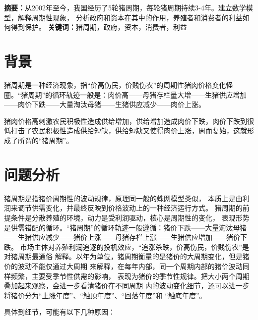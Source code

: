 \documentclass[a4paper,AutoFakeBold,AutoFakeSlant]{ctexart}
\title{\heiti{数学建模HW2实验报告}}
\author{PB19151769~~~~~~马宇骁}
\makeatletter
\renewcommand{\abstractname}{}    %
\renewenvironment{abstract}{%
      \if@twocolumn
        \section*{\abstractname}%
      \else
        \small
        \begin{center}%
          {\bfseries \abstractname\vspace{-.5em}\vspace{\z@}}%
        \end{center}%
      \fi}
      {}
\makeatother
\begin{document}
\maketitle

\begin{abstract} \kaishu
\noindent 
\textbf{\heiti 摘要：}从2002年至今，我国经历了5轮猪周期，每轮猪周期持续3-4年。建立数学模型，解释周期性现象，
分析政府和资本在其中的作用，养殖者和消费者的利益如何得到保护。
   \newline
\textbf{\heiti 关键词：}猪周期，政府，资本，消费者，利益
\end{abstract}



\section{背景}


猪周期是一种经济现象，指“价高伤民，价贱伤农”的周期性猪肉价格变化怪圈。“猪周期”的循环轨迹一般是：肉价高——母猪存栏量大增——生猪供应增加——肉价下跌——大量淘汰母猪——生猪供应减少——肉价上涨。

猪肉价格高刺激农民积极性造成供给增加，供给增加造成肉价下跌，肉价下跌到很低打击了农民积极性造成供给短缺，供给短缺又使得肉价上涨，周而复始，这就形成了所谓的“猪周期”。

\section{问题分析}

猪周期是指猪价周期性的波动规律，原理同一般的蛛网模型类似，
本质上是由利润来调节供需变化，并最终反映到价格波动上的一种经济运行方式。
猪周期的前提条件是分散养殖的环境，动力是受利润驱动，核心是周期性的变化，
表现形势是供需错配的循环。“猪周期”的循环轨迹一般遵循：猪价下跌——大量淘汰母猪
——生猪供应减少——猪价上涨——母猪存栏上涨——生猪供应增加——猪价下跌。
市场主体对养殖利润追逐的投机效应，“追涨杀跌，价高伤民，价贱伤农”是对猪周期最通俗
解释。以年为单位，猪周期衡量的是猪价的大周期变化，但是猪价的波动不能仅通过大周期
来解释，在每年内部，同一个周期内部的猪价波动同样频繁，主要受季节性供需的影响，
表现为猪价的季节性规律。把大小两个周期叠加起来观察，会进一步看清猪价在不同周期
内的波动变化细节，还可以进一步将猪价分为“上涨年度”、“触顶年度”、“回落年度”和
“触底年度”。\cite{历次猪周期回顾及本轮周期展望}

具体到细节，可能有以下几种原因：
\end{document}
